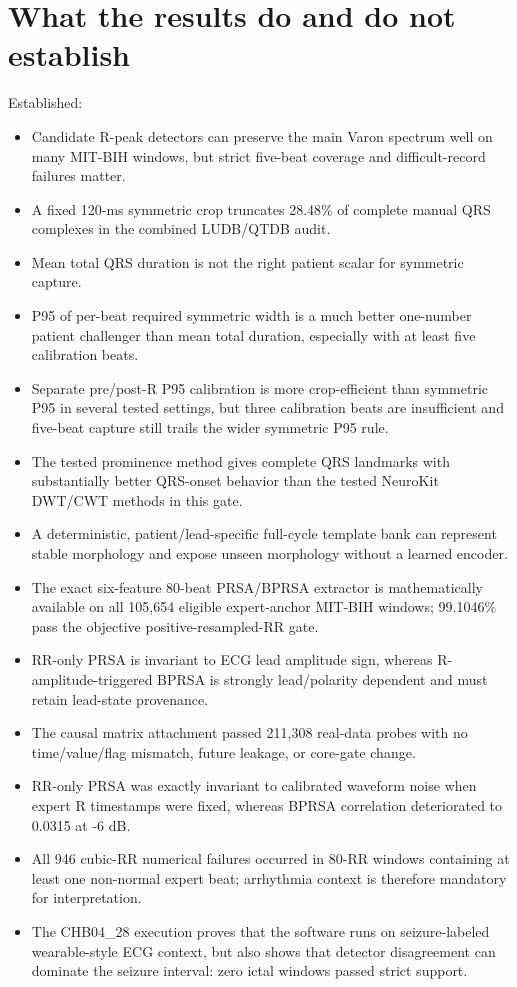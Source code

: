 \documentclass[11pt,a4paper]{article}
\begin{document}
\section{What the results do and do not establish}

Established:

\begin{itemize}
  \item Candidate R-peak detectors can preserve the main Varon spectrum well on many MIT-BIH windows, but strict five-beat coverage and difficult-record failures matter.
  \item A fixed 120-ms symmetric crop truncates 28.48\% of complete manual QRS complexes in the combined LUDB/QTDB audit.
  \item Mean total QRS duration is not the right patient scalar for symmetric capture.
  \item P95 of per-beat required symmetric width is a much better one-number patient challenger than mean total duration, especially with at least five calibration beats.
  \item Separate pre/post-R P95 calibration is more crop-efficient than symmetric P95 in several tested settings, but three calibration beats are insufficient and five-beat capture still trails the wider symmetric P95 rule.
  \item The tested prominence method gives complete QRS landmarks with substantially better QRS-onset behavior than the tested NeuroKit DWT/CWT methods in this gate.
  \item A deterministic, patient/lead-specific full-cycle template bank can represent stable morphology and expose unseen morphology without a learned encoder.
  \item The exact six-feature 80-beat PRSA/BPRSA extractor is mathematically available on all 105,654 eligible expert-anchor MIT-BIH windows; 99.1046\% pass the objective positive-resampled-RR gate.
  \item RR-only PRSA is invariant to ECG lead amplitude sign, whereas R-amplitude-triggered BPRSA is strongly lead/polarity dependent and must retain lead-state provenance.
  \item The causal matrix attachment passed 211,308 real-data probes with no time/value/flag mismatch, future leakage, or core-gate change.
  \item RR-only PRSA was exactly invariant to calibrated waveform noise when expert R timestamps were fixed, whereas BPRSA correlation deteriorated to 0.0315 at -6 dB.
  \item All 946 cubic-RR numerical failures occurred in 80-RR windows containing at least one non-normal expert beat; arrhythmia context is therefore mandatory for interpretation.
  \item The CHB04\_28 execution proves that the software runs on seizure-labeled wearable-style ECG context, but also shows that detector disagreement can dominate the seizure interval: zero ictal windows passed strict support.
\end{itemize}
\end{document}
